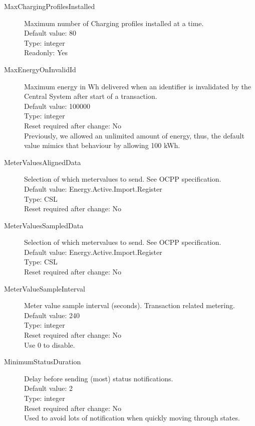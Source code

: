 \begin{description}
\item[MaxChargingProfilesInstalled]  Maximum number of Charging profiles installed at a time.\\
  Default value: 80\\
  Type: integer\\
  Readonly: Yes\\

\item[MaxEnergyOnInvalidId] Maximum energy in Wh delivered when an identifier is invalidated by the Central System after start of a transaction.\\
  Default value: 100000\\
  Type: integer\\
  Reset required after change: No\\
  Previously, we allowed an unlimited amount of energy, thus, the default value mimics that behaviour by allowing 100 kWh.\\

\item[MeterValuesAlignedData] Selection of which metervalues to send. See OCPP specification.\\
  Default value: Energy.Active.Import.Register\\
  Type: CSL\\
  Reset required after change: No\\

\item[MeterValuesSampledData] Selection of which metervalues to send. See OCPP specification.\\
  Default value: Energy.Active.Import.Register\\
  Type: CSL\\
  Reset required after change: No\\

\item[MeterValueSampleInterval] Meter value sample interval (seconds). Transaction related metering.\\
  Default value: 240\\
  Type: integer\\
  Reset required after change: No\\
  Use 0 to disable.\\

\item[MinimumStatusDuration] Delay before sending (most) status notifications.\\
  Default value: 2\\
  Type: integer\\
  Reset required after change: No\\
  Used to avoid lots of notification when quickly moving through states.\\


\end{description}
